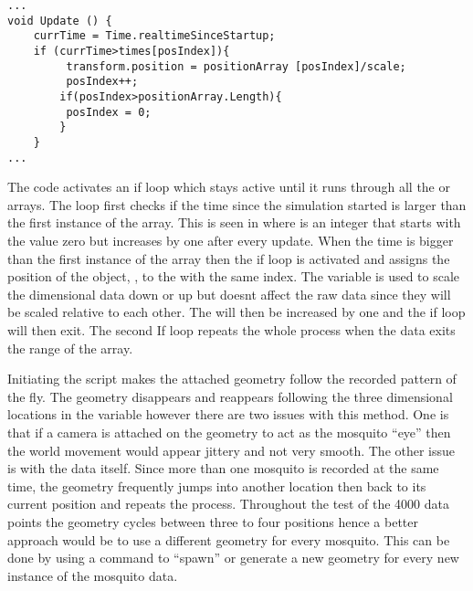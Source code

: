 \bigskip
\begin{code1}
\begin{verbatim}
...
void Update () {
	currTime = Time.realtimeSinceStartup;
	if (currTime>times[posIndex]){
         transform.position = positionArray [posIndex]/scale;
         posIndex++;
        if(posIndex>positionArray.Length){
         posIndex = 0;
        }
    }
...
\end{verbatim}
\label{code:c-code}
\end{code1}

 The code activates an if loop which stays active until it runs through all the  or  arrays. The loop first checks if the time since the simulation started is larger than the first instance of the  array. This is seen in  where  is an integer that starts with the value zero but increases by one after every update. When the time is bigger than the first instance of the  array then the if loop is activated and assigns the position of the object, , to the  with the same index. The  variable is used to scale the dimensional data down or up but doesnt affect the raw data since they will be scaled relative to each other. The  will then be increased by one and the if loop will then exit. The second If loop repeats the whole process when the data exits the range of the array.

 Initiating the script makes the attached geometry follow the recorded pattern of the fly. The geometry disappears and reappears following the three dimensional locations in the variable  however there are two issues with this method. One is that if a camera is attached on the geometry to act as the mosquito ``eye'' then the world movement would appear jittery and not very smooth. The other issue is with the data itself. Since more than one mosquito is recorded at the same time, the geometry frequently jumps into another location then back to its current position and repeats the process. Throughout the test of the 4000 data points the geometry cycles between three to four positions hence a better approach would be to use a different geometry for every mosquito. This can be done by using a command to ``spawn'' or generate a new geometry for every new instance of the mosquito data.

